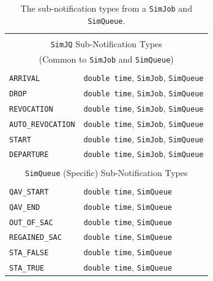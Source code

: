 \begin{table}[!htbp]
	\label{tab:guided:sub-notification-types}
	\caption{The sub-notification types from a
             \texttt{SimJob} and \texttt{SimQueue}.}
	\begin{center}
		\begin{tabular}{|l|l|}
			\hline
			\multicolumn{2}{|c|}{} \\
			\multicolumn{2}{|c|}{\lstinline[basicstyle=\ttfamily]{SimJQ} Sub-Notification Types} \\
			\multicolumn{2}{|c|}{(Common to \lstinline[basicstyle=\ttfamily]{SimJob}
            and \lstinline[basicstyle=\ttfamily]{SimQueue})} \\
			\multicolumn{2}{|c|}{} \\
			\hline
			\lstinline|ARRIVAL|            & \lstinline|double time|, \lstinline|SimJob|, \lstinline|SimQueue| \\ \hline
			\lstinline|DROP|               & \lstinline|double time|, \lstinline|SimJob|, \lstinline|SimQueue| \\ \hline
			\lstinline|REVOCATION|         & \lstinline|double time|, \lstinline|SimJob|, \lstinline|SimQueue| \\ \hline
			\lstinline|AUTO_REVOCATION|    & \lstinline|double time|, \lstinline|SimJob|, \lstinline|SimQueue| \\ \hline
			\lstinline|START|              & \lstinline|double time|, \lstinline|SimJob|, \lstinline|SimQueue| \\ \hline
			\lstinline|DEPARTURE|          & \lstinline|double time|, \lstinline|SimJob|, \lstinline|SimQueue| \\ \hline
			\hline
			\multicolumn{2}{|c|}{} \\
			\multicolumn{2}{|c|}{\lstinline[basicstyle=\ttfamily]{SimQueue} (Specific) Sub-Notification Types} \\
			\multicolumn{2}{|c|}{} \\
			\hline
			\lstinline|QAV_START|    & \lstinline|double time|, \lstinline|SimQueue| \\ \hline
			\lstinline|QAV_END|      & \lstinline|double time|, \lstinline|SimQueue| \\ \hline
			\lstinline|OUT_OF_SAC|   & \lstinline|double time|, \lstinline|SimQueue| \\ \hline
			\lstinline|REGAINED_SAC| & \lstinline|double time|, \lstinline|SimQueue| \\ \hline
			\lstinline|STA_FALSE|    & \lstinline|double time|, \lstinline|SimQueue| \\ \hline
			\lstinline|STA_TRUE|     & \lstinline|double time|, \lstinline|SimQueue| \\ \hline
        \end{tabular}
	\end{center}
\end{table}


